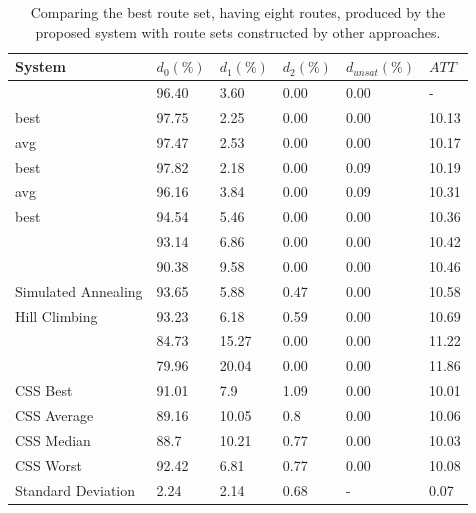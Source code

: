     \begin{table}[H]
    \centering
    \hspace*{-1.0cm}
    \begin{tabular}{|l||l|l|l|l|l|}
    \hline
    \textbf{System} & $d_0(\%)$ & $d_1(\%)$ & $d_2(\%)$ & $d_{unsat}(\%)$ & $ATT$ \\
    \hline
    \citet{nikolic14} & 96.40 & 3.60 & 0.00 & 0.00 & - \\
    \citet{kechagiopoulos14} best & 97.75 & 2.25 & 0.00 & 0.00 & 10.13 \\
    \citet{kechagiopoulos14} avg & 97.47 & 2.53 & 0.00 & 0.00 & 10.17 \\
    \citet{chew12} best & 97.82 & 2.18 & 0.00 & 0.09 & 10.19 \\
    \citet{chew12} avg & 96.16 & 3.84 & 0.00 & 0.09 & 10.31 \\
    \citet{fan10} best & 94.54 & 5.46 & 0.00 & 0.00 & 10.36 \\
    \citet{zhang10} & 93.14 & 6.86 & 0.00 & 0.00 & 10.42 \\
    \citet{chakroborty02} & 90.38 & 9.58 & 0.00 & 0.00 & 10.46 \\
    \citet{fan10} Simulated Annealing & 93.65 & 5.88 & 0.47 & 0.00 & 10.58 \\
    \citet{fan10} Hill Climbing & 93.23 & 6.18 & 0.59 & 0.00 & 10.69 \\
    \citet{kidwai98} & 84.73 & 15.27 & 0.00 & 0.00 & 11.22 \\
    \citet{baaj91} & 79.96 & 20.04 & 0.00 & 0.00 & 11.86 \\ 
    \hline
    CSS Best & 91.01 & 7.9 & 1.09 & 0.00 & 10.01\\
    CSS Average & 89.16 & 10.05 & 0.8 & 0.00 & 10.06\\
    CSS Median & 88.7 & 10.21 & 0.77 & 0.00 & 10.03\\
    CSS Worst & 92.42 & 6.81 & 0.77 & 0.00 & 10.08\\
    Standard Deviation & 2.24 & 2.14 & 0.68 & - & 0.07\\
    \hline
    \end{tabular}
    \caption {Comparing the best route set, having eight routes, produced by the proposed system with route sets constructed by other approaches.}
    \label{table:performanceComparison_8}
    \end{table}





